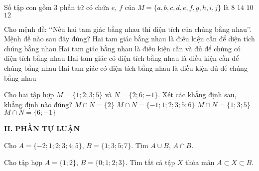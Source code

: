 \begin{ex}%
	Số tập con gồm $3$ phần tử có chứa $e$, $f$ của $M = \{ a,b,c,d,e,f,g,h,i,j \}$ là
	\choice
	{\True $8$}
	{$14$}
	{$10$}
	{$12$}
\end{ex}

\begin{ex}%
	Cho mệnh đề: \lq\lq Nếu hai tam giác bằng nhau thì diện tích của chúng bằng nhau\rq\rq. Mệnh đề nào sau đây đúng?
	\choice
	{Hai tam giác bằng nhau là điều kiện cần để diện tích chúng bằng nhau}
	{Hai tam giác bằng nhau là điều kiện cần và đủ để chúng có diện tích bằng nhau}
	{\True Hai tam giác có diện tích bằng nhau là điều kiện cần để chúng bằng nhau}
	{Hai tam giác có diện tích bằng nhau là điều kiện đủ để chúng bằng nhau}
\end{ex}

\begin{ex}%
	Cho hai tập hợp $M = \{1;2;3;5\}$ và $N = \{2;6;-1\}$. Xét các khẳng định sau, khẳng định nào đúng?
	\choice
	{\True $M \cap N = \{2\}$}
	{$M \cap N = \{-1;1;2;3;5;6\}$}
	{$M \cap N = \{1;3;5\}$}
	{$M \cap N = \{6;-1\}$}
\end{ex}

\noindent\textbf{II. PHẦN TỰ LUẬN}

\begin{bt}%
	Cho $A = \{-2;1;2;3;4;5\}$, $B = \{1;3;5;7\}$. Tìm $A \cup B$, $A \cap B$.
\end{bt}

\begin{bt}%
	Cho tập hợp $A = \{1;2\}$, $B = \{0;1;2;3\}$. Tìm tất cả tập $X$ thỏa mãn $A \subset X \subset B$. 
\end{bt}


